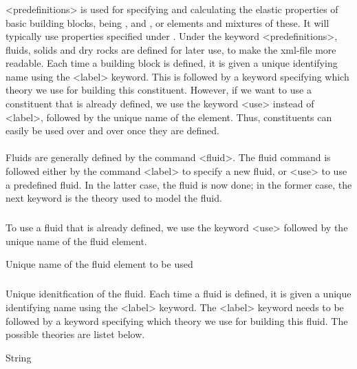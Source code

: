 {\subsubsection{}
 \slist
   \item \Description <predefinitions> is used for specifying and calculating the elastic properties of basic building blocks, being ,  and , or elements and mixtures of these. It will typically use properties specified under . Under the keyword <predefinitions>, fluids, solids and dry rocks are defined for later use, to make the xml-file more readable. Each time a building block is defined, it is given a unique identifying name using the <label> keyword. This is followed by a keyword specifying which theory we use for building this constituent. However, if we want to use a constituent that is already defined, we use the keyword <use> instead of <label>, followed by the unique name of the element. Thus, constituents can easily be used over and over once they are defined. 
   \item \Argument 
   \item \Default 
 \elist

\paragraph{}
 \slist
   \item \Description Fluids are generally defined by the command <fluid>. The fluid command is followed either by the command <label> to specify a new fluid, or <use> to use a predefined fluid. In the latter case, the fluid is now done; in the former case, the next keyword is the theory used to model the fluid.
   \item \Argument 
   \item \Default 
 \elist

\subparagraph{}
 \slist
   \item \Description  To use a fluid that is already defined, we use the keyword <use> followed by the unique name of the fluid element.
   \item \Argument Unique name of the fluid element to be used
   \item \Default 
 \elist

\subparagraph{}
 \slist
   \item \Description Unique idenitfication of the fluid. Each time a fluid is defined, it is given a unique identifying name using
the <label> keyword. The <label> keyword needs to be followed by a keyword specifying which theory we use for building this fluid. The possible theories are listet below. 
   \item \Argument String
   \item \Default 
 \elist

}
